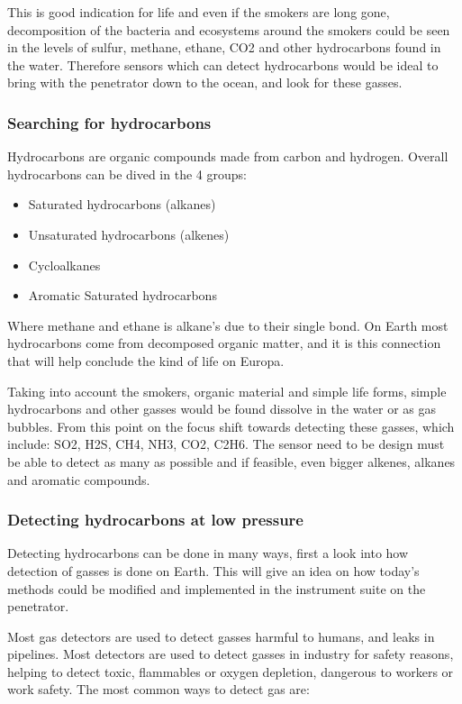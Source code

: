 \documentclass[10pt,a4paper,draft]{report}
\begin{document}
This is good indication for life and even if the smokers are long gone, decomposition of the bacteria and ecosystems around the smokers could be seen in the levels of sulfur, methane, ethane, CO2 and other hydrocarbons found in the water. Therefore sensors which can detect hydrocarbons would be ideal to bring with the penetrator down to the ocean, and look for these gasses.\par

\subsubsection{Searching for hydrocarbons}
Hydrocarbons are organic compounds made from carbon and hydrogen. Overall hydrocarbons can be dived in the 4 groups:\par

\begin{itemize}

   \item Saturated hydrocarbons (alkanes)
   \item Unsaturated hydrocarbons (alkenes)
   \item Cycloalkanes
   \item Aromatic Saturated hydrocarbons
   
\end{itemize}

Where methane and ethane is alkane’s due to their single bond. On Earth most hydrocarbons come from decomposed organic matter, and it is this connection that will help conclude the kind of life on Europa.\par
Taking into account the smokers, organic material and simple life forms, simple hydrocarbons and other gasses would be found dissolve in the water or as gas bubbles. From this point on the focus shift towards detecting these gasses, which include: SO2, H2S, CH4, NH3, CO2, C2H6. The sensor need to be design must be able to detect as many as possible and if feasible, even bigger alkenes, alkanes and aromatic compounds.\par

\subsubsection{Detecting hydrocarbons at low pressure}
Detecting hydrocarbons can be done in many ways, first a look into how detection of gasses is done on Earth. This will give an idea on how today’s methods could be modified and implemented in the instrument suite on the penetrator.\par
Most gas detectors are used to detect gasses harmful to humans, and leaks in pipelines. Most detectors are used to detect gasses in industry for safety reasons, helping to detect toxic, flammables or oxygen depletion, dangerous to workers or work safety. The most common ways to detect gas are:
\end{document}
